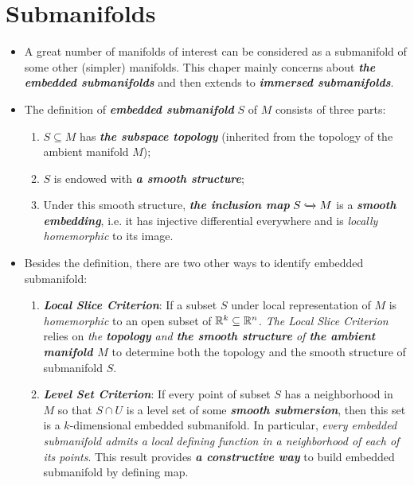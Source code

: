 \documentclass[11pt]{article}
\begin{document}
\section{Submanifolds}
\begin{itemize}
\item \begin{remark}
A great number of manifolds of interest can be considered as a submanifold of some other (simpler) manifolds. This chaper mainly concerns about \emph{\textbf{the embedded submanifolds}} and then extends to \emph{\textbf{immersed submanifolds}}.  
\end{remark}

\item \begin{remark}
The definition of \emph{\textbf{embedded submanifold}} $S$ of $M$ consists of three parts:
\begin{enumerate}
\item $S \subseteq M$ has \emph{\textbf{the subspace topology}} (inherited from the topology of the ambient manifold $M$);
\item $S$ is endowed with \emph{\textbf{a smooth structure}};
\item Under this smooth structure, \emph{\textbf{the inclusion map}} $S \xhookrightarrow{} M$ is a \emph{\textbf{smooth embedding}}, i.e. it has injective differential everywhere and is \emph{locally homemorphic} to its image.
\end{enumerate}
\end{remark}

\item \begin{remark}
Besides the definition, there are two other ways to identify embedded submanifold:
\begin{enumerate}
\item \emph{\textbf{Local Slice Criterion}}: If a subset $S$ under local representation of $M$ is \emph{homemorphic} to an open subset of ${\mathbb R}^{k} \subseteq {\mathbb R}^{n}$. \emph{The Local Slice Criterion} relies on \emph{the \textbf{topology} and \textbf{the smooth structure} of \textbf{the ambient manifold $M$}} to determine both the topology and the smooth structure of submanifold $S$.
\item \emph{\textbf{Level Set Criterion}}: If every point of subset $S$ has a neighborhood in $M$ so that $S \cap U$ is a level set of some \emph{\textbf{smooth submersion}}, then this set is a  $k$-dimensional embedded submanifold.  In particular,  \emph{every embedded submanifold admits a local defining function in a neighborhood of each of its points}. This result provides \emph{\textbf{a constructive way}} to build embedded submanifold by defining map.
\end{enumerate}
\end{remark}


\end{itemize}
\end{document}
